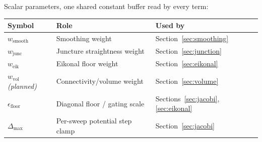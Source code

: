 \documentclass[11pt]{article}
\begin{document}
Scalar parameters, one shared constant buffer read by every term:

\begin{center}
\begin{tabular}{@{}lll@{}}
\toprule
Symbol & Role & Used by \\
\midrule
$w_{\text{smooth}}$ & Smoothing weight & Section~\ref{sec:smoothing} \\
$w_{\text{junc}}$ & Juncture straightness weight & Section~\ref{sec:junction} \\
$w_{\text{eik}}$ & Eikonal floor weight & Section~\ref{sec:eikonal} \\
$w_{\text{vol}}$ \emph{(planned)} & Connectivity/volume weight & Section~\ref{sec:volume} \\
$\epsilon_{\text{floor}}$ & Diagonal floor / gating scale & Sections~\ref{sec:jacobi}, \ref{sec:eikonal} \\
$\Delta_{\max}$ & Per-sweep potential step clamp & Section~\ref{sec:jacobi} \\
\bottomrule
\end{tabular}
\end{center}
\end{document}
